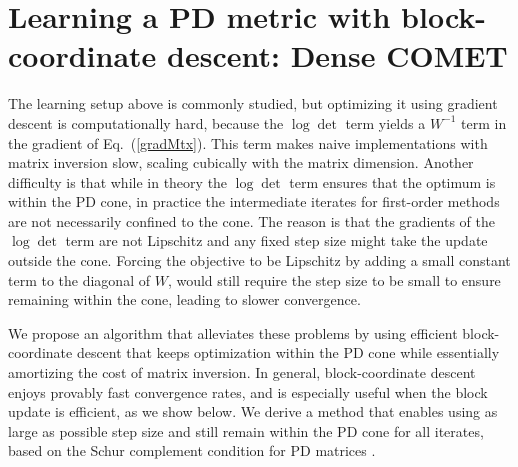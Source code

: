 \documentclass[twoside,11pt]{article}
\newcommand\mat[1]{{#1}}
\newcommand{\W}{\mat{W}}
\newcommand{\newW}{{\mat{W^{new}}}}
\renewcommand{\eqref}[1]{Eq.~(\ref{#1})}
\begin{document}
\section{Learning a PD metric with block-coordinate descent: Dense COMET}
\label{learing_dense_comet}
\vskip -5pt
The learning setup above is commonly studied, but 
optimizing it using gradient descent is computationally hard, because the $\log \det$ term yields a $\W^{-1}$ term in the gradient of \eqref{gradMtx}. This term makes naive implementations with matrix inversion slow, scaling cubically with the matrix dimension. Another difficulty is that while in theory the $\log \det$ term ensures that the optimum is within the PD cone, in practice the intermediate iterates for first-order methods are not necessarily confined to the cone. The reason is that the gradients of the $\log \det$ term are not Lipschitz and any fixed step size might take the update outside the cone. Forcing the objective to be Lipschitz by adding a small constant term to the diagonal of $\W$, would still require the step size to be small to ensure remaining within the cone, leading to slower convergence. 

We propose an algorithm that alleviates these problems by using efficient block-coordinate descent that keeps optimization within the PD cone while essentially amortizing the cost of matrix inversion.
In general, block-coordinate descent enjoys provably fast convergence rates, and is especially useful when the block update is efficient, as we show below. We derive a method that enables using as large as possible step size and still remain within the PD cone for all iterates, based on the Schur complement condition for PD matrices \citep[p. 650]{boyd2004convex}.

\end{document}
